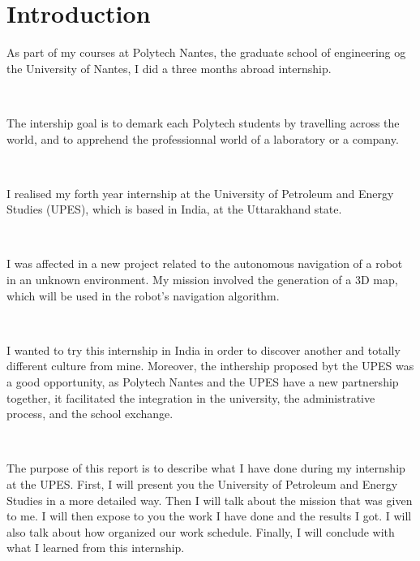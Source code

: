 \chapter{Introduction}

As part of my courses at Polytech Nantes, the graduate school of engineering og the University of Nantes, I did a three months abroad internship. 

~~

The intership goal is to demark each Polytech students by travelling across the world, and to apprehend the professionnal world of a laboratory or a company.

~~

I realised my forth year internship at the University of Petroleum and Energy Studies (UPES), which is based in India, at the Uttarakhand state.

~~

I was affected in a new project related to the autonomous navigation of a robot in an unknown environment. My mission involved the generation of a 3D map, which will be used in the robot's navigation algorithm.

~~

I wanted to try this internship in India in order to discover another and totally different culture from mine. Moreover, the inthership proposed byt the UPES was a good opportunity, as Polytech Nantes and the UPES have a new partnership together, it facilitated the integration in the university, the administrative process, and the school exchange. 

~~

The purpose of this report is to describe what I have done during my internship at the UPES. First, I will present you the University of Petroleum and Energy Studies in a more detailed way. Then I will talk about the mission that was given to me. I will then expose to you the work I have done and the results I got. I will also talk about how organized our work schedule. Finally, I will conclude with what I learned from this internship.
